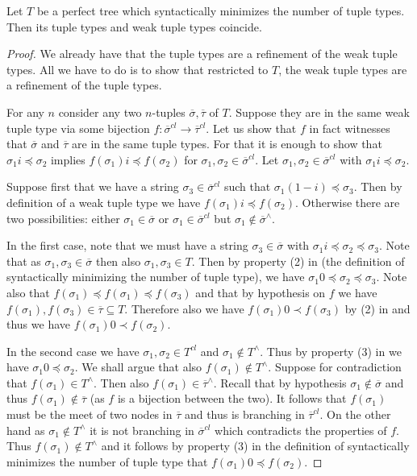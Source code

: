 \begin{lemma} \label{lem:coincide_smntt}
Let $T$ be a perfect tree which syntactically minimizes the number of tuple types. Then its tuple types and weak tuple types coincide.
\end{lemma}
\begin{proof}
We already have that the tuple types are a refinement of the weak tuple types. All we have to do is to show that restricted to $T$, the weak tuple types are a refinement of the tuple types.

For any $n$ consider any two $n$-tuples $\overline{\sigma},\overline{\tau}$ of $T$. Suppose they are in the same weak tuple type via some bijection $f:\overline{\sigma}^{cl} \rightarrow \overline{\tau}^{cl}$. Let us show that $f$ in fact witnesses that $\overline{\sigma}$ and $\overline{\tau}$ are in the same tuple types. For that it is enough to show that $\sigma_1 i \preceq \sigma_2$ implies $f(\sigma_1) i \preceq f(\sigma_2)$ for $\sigma_1,\sigma_2 \in \overline{\sigma}^{cl}$. Let $\sigma_1,\sigma_2 \in \overline{\sigma}^{cl}$ with $\sigma_1 i \preceq \sigma_2$. 

Suppose first that we have a string $\sigma_3 \in \overline{\sigma}^{cl}$ such that $\sigma_1 (1-i) \preceq \sigma_3$. Then by definition of a weak tuple type we have $f(\sigma_1) i \preceq f(\sigma_2)$. Otherwise there are two possibilities: either $\sigma_1 \in \overline{\sigma}$ or $\sigma_1 \in \overline{\sigma}^{cl}$ but $\sigma_1 \notin \overline{\sigma}^{\wedge}$. 

In the first case, note that we must have a string $\sigma_3 \in \overline{\sigma}$ with $\sigma_1 i \preceq \sigma_2 \preceq \sigma_3$. Note that as $\sigma_1,\sigma_3 \in \overline{\sigma}$ then also $\sigma_1,\sigma_3 \in T$. Then by property (2) in  (the definition of syntactically minimizing the number of tuple type), we have $\sigma_1 0 \preceq \sigma_2 \preceq \sigma_3$. Note also that $f(\sigma_1) \preceq f(\sigma_1) \preceq f(\sigma_3)$ and that by hypothesis on $f$ we have $f(\sigma_1),f(\sigma_3) \in \overline{\tau} \subseteq T$. Therefore also we have $f(\sigma_1)0 \prec f(\sigma_3)$ by (2) in  and thus we have $f(\sigma_1)0 \prec f(\sigma_2)$.

In the second case we have $\sigma_1,\sigma_2 \in T^{cl}$ and $\sigma_1 \notin T^{\wedge}$. Thus by property (3) in  we have $\sigma_1 0 \preceq \sigma_2$. We shall argue that also $f(\sigma_1) \notin T^{\wedge}$. Suppose for contradiction that $f(\sigma_1) \in T^{\wedge}$. Then also $f(\sigma_1) \in \overline{\tau}^{\wedge}$. Recall that by hypothesis $\sigma_1 \notin \overline{\sigma}$ and thus $f(\sigma_1) \notin \overline{\tau}$ (as $f$ is a bijection between the two). It follows that $f(\sigma_1)$ must be the meet of two nodes in $\overline{\tau}$ and thus is branching in $\overline{\tau}^{cl}$. On the other hand as $\sigma_1 \notin T^{\wedge}$ it is not branching in $\overline{\sigma}^{cl}$ which contradicts the properties of $f$. Thus $f(\sigma_1) \notin T^{\wedge}$ and it follows by property (3) in the definition of syntactically minimizes the number of tuple type that $f(\sigma_1) 0 \preceq f(\sigma_2)$.


\end{proof}
